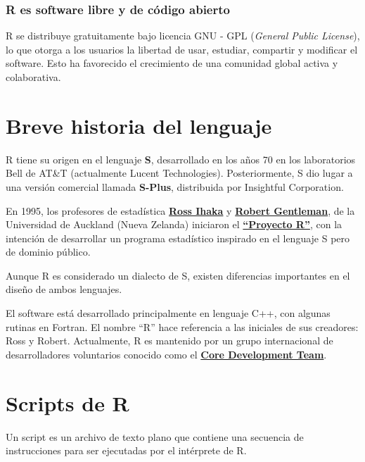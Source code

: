 \documentclass[
  spanish,
  letterpaper,
  DIV=11,
  numbers=noendperiod]{scrreprt}
\begin{document}
\subsubsection{R es software libre y de código
abierto}\label{r-es-software-libre-y-de-cuxf3digo-abierto}

R se distribuye gratuitamente bajo licencia GNU - GPL (\emph{General
Public License}), lo que otorga a los usuarios la libertad de usar,
estudiar, compartir y modificar el software. Esto ha favorecido el
crecimiento de una comunidad global activa y colaborativa.

\section{Breve historia del lenguaje}\label{breve-historia-del-lenguaje}

R tiene su origen en el lenguaje \textbf{S}, desarrollado en los años 70
en los laboratorios Bell de AT\&T (actualmente Lucent Technologies).
Posteriormente, S dio lugar a una versión comercial llamada
\textbf{S-Plus}, distribuida por Insightful Corporation.

En 1995, los profesores de estadística
\href{https://en.wikipedia.org/wiki/Ross_Ihaka}{\textbf{Ross Ihaka}} y
\href{https://en.wikipedia.org/wiki/Robert_Gentleman_(statistician)}{\textbf{Robert
Gentleman}}, de la Universidad de Auckland (Nueva Zelanda) iniciaron el
\href{https://en.wikipedia.org/wiki/R_(programming_language)}{\textbf{``Proyecto
R''}}, con la intención de desarrollar un programa estadístico inspirado
en el lenguaje S pero de dominio público.

Aunque R es considerado un dialecto de S, existen diferencias
importantes en el diseño de ambos lenguajes.

El software está desarrollado principalmente en lenguaje C++, con
algunas rutinas en Fortran. El nombre ``R'' hace referencia a las
iniciales de sus creadores: Ross y Robert. Actualmente, R es mantenido
por un grupo internacional de desarrolladores voluntarios conocido como
el \href{https://www.r-project.org/contributors.html}{\textbf{Core
Development Team}}.

\section{Scripts de R}\label{scripts-de-r}

Un script es un archivo de texto plano que contiene una secuencia de
instrucciones para ser ejecutadas por el intérprete de R.
\end{document}
